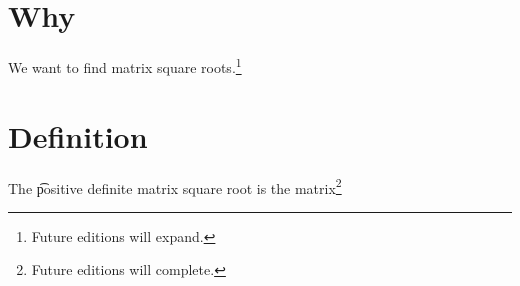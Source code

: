 
\section*{Why}

We want to find matrix square roots.\footnote{Future editions will expand.}

\section*{Definition}

The \t{positive definite matrix square root} is the matrix\footnote{Future editions will complete.}

\blankpage